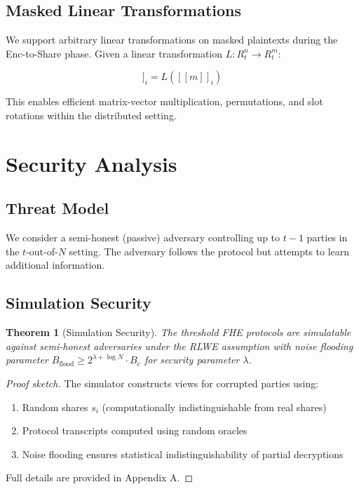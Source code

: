 \documentclass[11pt,a4paper]{article}
\newtheorem{theorem}{Theorem}[section]
\begin{document}
\subsection{Masked Linear Transformations}

We support arbitrary linear transformations on masked plaintexts during the Enc-to-Share phase. Given a linear transformation $L: R_t^n \to R_t^m$:

\begin{equation}
[\![L(m)]\!]_i = L([\![m]\!]_i)
\end{equation}

This enables efficient matrix-vector multiplication, permutations, and slot rotations within the distributed setting.

\section{Security Analysis}

\subsection{Threat Model}

We consider a semi-honest (passive) adversary controlling up to $t-1$ parties in the $t$-out-of-$N$ setting. The adversary follows the protocol but attempts to learn additional information.

\subsection{Simulation Security}

\begin{theorem}[Simulation Security]
The threshold FHE protocols are simulatable against semi-honest adversaries under the RLWE assumption with noise flooding parameter $B_{\text{flood}} \geq 2^{\lambda + \log N} \cdot B_e$ for security parameter $\lambda$.
\end{theorem}

\begin{proof}[Proof sketch]
The simulator constructs views for corrupted parties using:
\begin{enumerate}
    \item Random shares $s_i$ (computationally indistinguishable from real shares)
    \item Protocol transcripts computed using random oracles
    \item Noise flooding ensures statistical indistinguishability of partial decryptions
\end{enumerate}
Full details are provided in Appendix A.
\end{proof}
\end{document}
